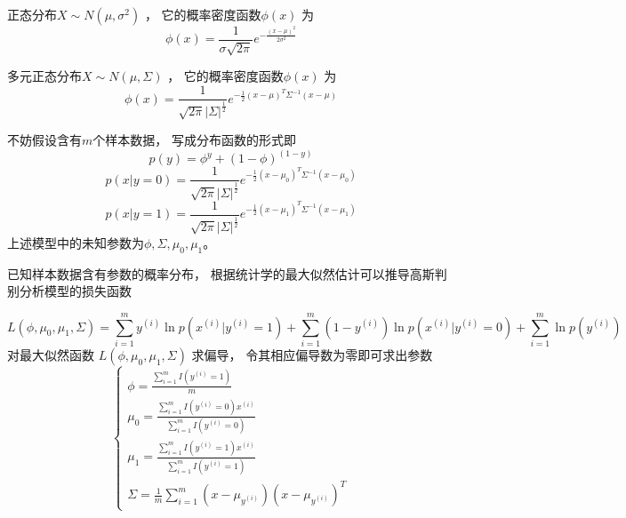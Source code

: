 \documentclass[cn,hazy,blue,14pt,normal]{elegantnote}
\begin{document}
正态分布$X\sim N(\mu, \sigma^2)$ ，
它的概率密度函数$\phi(x)$ 为
\begin{equation}
    \phi(x) = \frac{1}{\sigma \sqrt{2\pi}}
    e^{ -\frac{(x -\mu)^2}{2\sigma^2} }
\end{equation}

多元正态分布$X\sim N(\mu, \Sigma)$ ，
它的概率密度函数$\phi(x)$ 为
\begin{equation}
    \phi(x) = \frac{1}{ \sqrt{2\pi} |\Sigma|^{\frac{1}{2}}}
    e^{ -\frac{1}{2}(x -\mu)^T{\Sigma^{ - 1}}(x -\mu) }
\end{equation}

不妨假设含有$m$个样本数据，
写成分布函数的形式即
\begin{equation}
    p(y) = \phi^y +( 1-\phi)^(1 -y)
\end{equation}
\begin{equation}
    p(x|y = 0) = \frac{1}{ \sqrt{2\pi} |\Sigma|^{\frac{1}{2}}}
    e^{ -\frac{1}{2}(x -\mu_0)^T{\Sigma^{ - 1}}(x -\mu_0) }
\end{equation}
\begin{equation}
    p(x|y = 1) = \frac{1}{ \sqrt{2\pi} |\Sigma|^{\frac{1}{2}}}
    e^{ -\frac{1}{2}(x -\mu_1)^T{\Sigma^{ - 1}}(x -\mu_1) }
\end{equation}
上述模型中的未知参数为$\phi, \Sigma, \mu_0, \mu_1 $。

已知样本数据含有参数的概率分布，
根据统计学的最大似然估计可以推导高斯判别分析模型的损失函数

\begin{equation}
    L(\phi, \mu_0, \mu_1, \Sigma) =
    \sum_{i = 1}^m y^{(i)}\ln p(x^{(i)}|y^{(i)} = 1)
    +\sum_{i = 1}^m (1 -y^{(i)})\ln p(x^{(i)}|y^{(i)} = 0)
    +\sum_{i = 1}^m \ln p(y^{(i)})
\end{equation}
对最大似然函数 $L(\phi, \mu_0, \mu_1, \Sigma)$ 求偏导，
令其相应偏导数为零即可求出参数
\begin{equation}
    \begin{cases}
        \phi = \frac{\sum_{i = 1}^m I(y^{(i)} = 1)}{m} \\
        \mu_0 = \frac{\sum_{i = 1}^m I(y^{(i)} = 0)x^{(i)}}
        {\sum_{i = 1}^m I(y^{(i)} = 0)}                \\
        \mu_1= \frac{\sum_{i = 1}^m I(y^{(i)} = 1)x^{(i)}}
        {\sum_{i = 1}^m I(y^{(i)} = 1)}                \\
        \Sigma = \frac{1}{m}\sum_{i = 1}^m (x -\mu_{y^{(i)}})(x -\mu_{y^{(i)}})^T
    \end{cases}
\end{equation}
\end{document}
